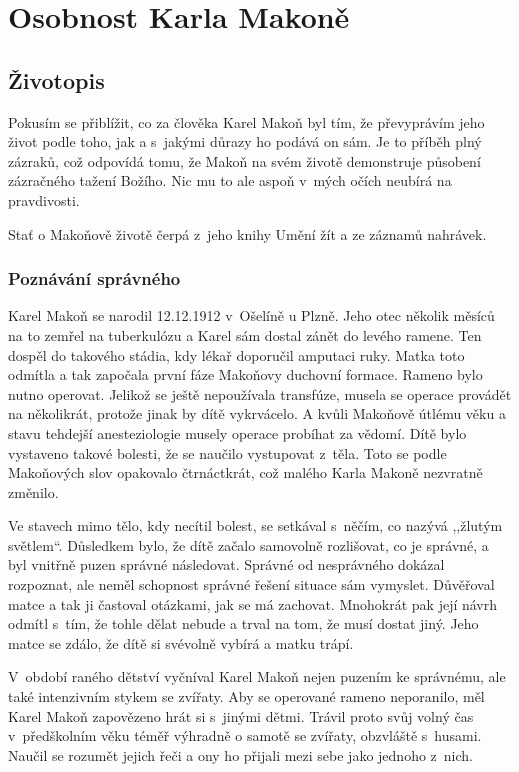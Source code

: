 \chapter{Osobnost Karla Makoně}

\section{Životopis}

Pokusím se přiblížit, co za člověka Karel Makoň byl tím, že převyprávím jeho
život podle toho, jak a s~jakými důrazy ho podává on sám. Je to příběh plný
zázraků, což odpovídá tomu, že Makoň na svém životě demonstruje působení
zázračného tažení Božího. Nic mu to ale aspoň v~mých očích neubírá na
pravdivosti.

Stať o Makoňově životě čerpá z~jeho knihy Umění žít a ze záznamů nahrávek.

\subsection{Poznávání správného}

Karel Makoň se narodil 12.12.1912 v~Ošelíně u Plzně. Jeho otec několik měsíců na
to zemřel na tuberkulózu a Karel sám dostal zánět do levého ramene. Ten dospěl
do takového stádia, kdy lékař doporučil amputaci ruky. Matka toto odmítla a tak
započala první fáze Makoňovy duchovní formace. Rameno bylo nutno operovat.
Jelikož se ještě nepoužívala transfúze, musela se operace provádět na
několikrát, protože jinak by dítě vykrvácelo. A kvůli Makoňově útlému věku a
stavu tehdejší anesteziologie musely operace probíhat za vědomí. Dítě bylo
vystaveno takové bolesti, že se naučilo vystupovat z~těla. Toto se podle
Makoňových slov opakovalo čtrnáctkrát, což malého Karla Makoně nezvratně
změnilo.

Ve stavech mimo tělo, kdy necítil bolest, se setkával s~něčím, co nazývá
,,žlutým světlem``.  Důsledkem bylo, že dítě začalo samovolně rozlišovat, co je
správné, a byl vnitřně puzen správné následovat. Správné od nesprávného dokázal
rozpoznat, ale neměl schopnost správné řešení situace sám vymyslet. Důvěřoval
matce a tak ji častoval otázkami, jak se má zachovat. Mnohokrát pak její návrh
odmítl s~tím, že tohle dělat nebude a trval na tom, že musí dostat jiný. Jeho
matce se zdálo, že dítě si svévolně vybírá a matku trápí.

V~období raného dětství vyčníval Karel Makoň nejen puzením ke správnému, ale
také intenzivním stykem se zvířaty. Aby se operované rameno neporanilo, měl
Karel Makoň zapovězeno hrát si s~jinými dětmi. Trávil proto svůj volný čas
v~předškolním věku téměř výhradně o samotě se zvířaty, obzvláště s~husami.
Naučil se rozumět jejich řeči a ony ho přijali mezi sebe jako jednoho z~nich.

